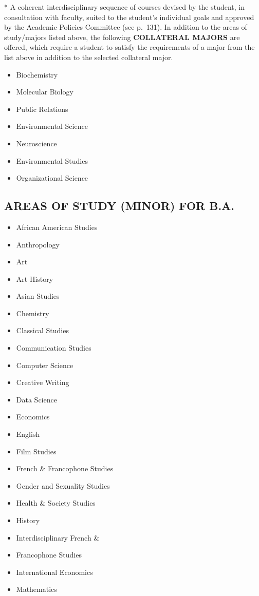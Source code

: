 \documentclass[
  letterpaper,
]{scrbook}
\providecommand{\tightlist}{%
  \setlength{\itemsep}{0pt}\setlength{\parskip}{0pt}}
\begin{document}
* A coherent interdisciplinary sequence of courses devised by the
student, in consultation with faculty, suited to the student's
individual goals and approved by the Academic Policies Committee (see
p.~131). In addition to the areas of study/majors listed above, the
following \textbf{COLLATERAL MAJORS} are offered, which require a
student to satisfy the requirements of a major from the list above in
addition to the selected collateral major.

\begin{itemize}
\tightlist
\item
  Biochemistry
\item
  Molecular Biology
\item
  Public Relations
\item
  Environmental Science
\item
  Neuroscience
\item
  Environmental Studies
\item
  Organizational Science
\end{itemize}

\hypertarget{areas-of-study-minor-for-b.a.}{%
\subsection*{AREAS OF STUDY (MINOR) FOR
B.A.}\label{areas-of-study-minor-for-b.a.}}

\begin{itemize}
\tightlist
\item
  African American Studies
\item
  Anthropology
\item
  Art
\item
  Art History
\item
  Asian Studies
\item
  Chemistry
\item
  Classical Studies
\item
  Communication Studies
\item
  Computer Science
\item
  Creative Writing
\item
  Data Science
\item
  Economics
\item
  English
\item
  Film Studies
\item
  French \& Francophone Studies
\item
  Gender and Sexuality Studies
\item
  Health \& Society Studies
\item
  History
\item
  Interdisciplinary French \&
\item
  Francophone Studies
\item
  International Economics
\item
  Mathematics
\end{itemize}
\end{document}

